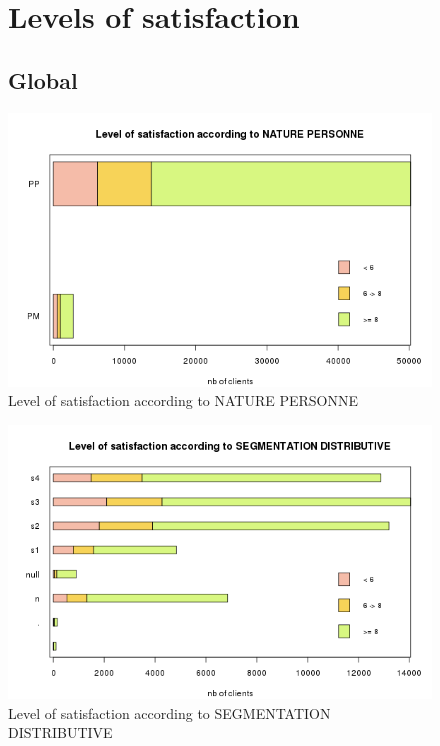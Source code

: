 \documentclass[a4paper, 11pt]{article}
\begin{document}
\newpage
\appendix
        \begin{figure}[!ht]
        \section{Levels of satisfaction}
        \label{app:satisfaction}
        	\subsection{Global}
        	\centering
                \includegraphics[width = 10 cm]{Remi/Level_of_satisfaction_according_to_NATURE_PERSONNE.png}
                \caption{Level of satisfaction according to NATURE PERSONNE}
                \label{fig:NATURE_PERSONNE}
        \end{figure}
        
        \begin{figure}[!ht]
        	\centering
                \includegraphics[height = 10 cm]{Remi/Level_of_satisfaction_according_to_SEGMENTATION_DISTRIBUTIVE.png}
                \caption{Level of satisfaction according to SEGMENTATION DISTRIBUTIVE}
                \label{fig:SEGMENTATION_DISTRIBUTIVE}
        \end{figure}
        
\end{document}
